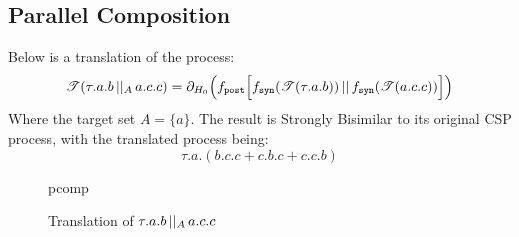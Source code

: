 \documentclass[../hons_project.tex]{subfiles}
\begin{document}
\newpage
\subsection{Parallel Composition}
Below is a translation of the process:
\[\mathscr{T}(\tau.a.b \,\vert\vert_{A}\, a.c.c)     = \partial_{H_{0}}\Bigl(f_{\mathtt{post}}\Bigl[f_{\mathtt{syn}}(\mathscr{T}(\tau.a.b)) \,\vert\vert\, f_{\mathtt{syn}}(\mathscr{T}(a.c.c))\Bigr]\Bigr)\]
Where the target set $A = \{a\}$.
The result is Strongly Bisimilar to its original CSP process, with the translated process being:
\[\tau.a.(b.c.c+c.b.c+c.c.b)\]
\begin{figure}[h!]
	\centering
	{pcomp}
	\caption{Translation of $\tau.a.b \,\vert\vert_{A}\, a.c.c$}
\end{figure}


\end{document}
